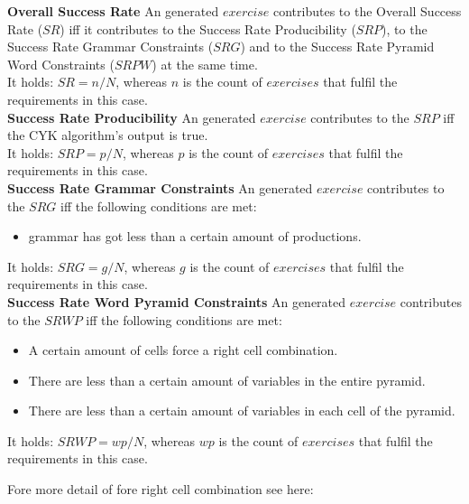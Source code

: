 \noindent\textbf{Overall Success Rate}
An generated $exercise$ contributes to the Overall Success Rate ($SR$) iff it contributes to the Success Rate Producibility ($SRP$), to the Success Rate Grammar Constraints ($SRG$) and to the Success Rate Pyramid Word Constraints ($SRPW$) at the same time.\\
It holds: $SR = n / N$, whereas $n$ is the count of $exercises$ that fulfil the requirements in this case.\\

\noindent\textbf{Success Rate Producibility}
An generated $exercise$ contributes to the $SRP$ iff the CYK algorithm's output is true.\\
It holds: $SRP = p / N$, whereas $p$ is the count of $exercises$ that fulfil the requirements in this case.\\

\noindent\textbf{Success Rate Grammar Constraints}
An generated $exercise$ contributes to the $SRG$ iff the following conditions are met:
\begin{itemize}
	\item grammar has got less than a certain amount of productions.
\end{itemize}
It holds: $SRG = g / N$, whereas $g$ is the count of $exercises$ that fulfil the requirements in this case.\\

\noindent\textbf{Success Rate Word Pyramid Constraints}
An generated $exercise$ contributes to the $SRWP$ iff the following conditions are met:
\begin{itemize}
	\item A certain amount of cells force a right cell combination.
	\item There are less than a certain amount of variables in the entire pyramid.
	\item There are less than a certain amount of variables in each cell of the pyramid.
\end{itemize}
It holds: $SRWP = wp / N$, whereas $wp$ is the count of $exercises$ that fulfil the requirements in this case.
\pagebreak

\noindent Fore more detail of fore right cell combination see here:\\

\noindent 
{}


\pagebreak